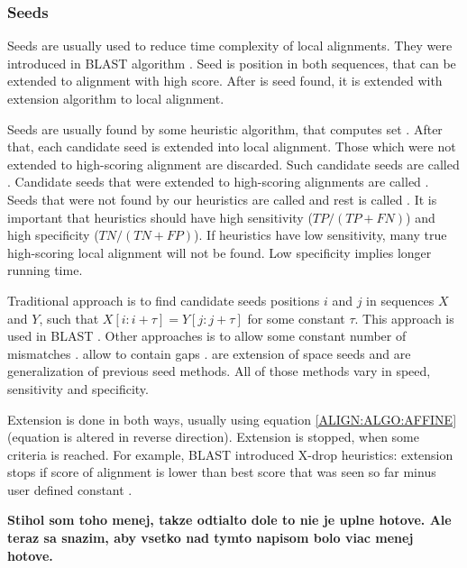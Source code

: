 \subsubsection{Seeds}

Seeds are usually used to reduce time complexity of local alignments.  They were
introduced in BLAST algorithm \cite{Altschul1990}.  Seed is position in both
sequences, that can be extended to alignment with high score. After is seed
found, it is extended with extension algorithm to local alignment.

Seeds are usually found by some heuristic algorithm, that computes set
. After that, each candidate seed is extended into
local alignment. Those which were not extended to high-scoring alignment are
discarded. Such candidate seeds are called .
Candidate seeds that were extended to high-scoring alignments are called
.  Seeds that were not found by our heuristics
are called  and rest is called
. It is important that heuristics should have
high sensitivity ($TP/(TP+FN)$) and high specificity ($TN/(TN+FP)$). If
heuristics have low sensitivity, many true high-scoring local alignment will not
be found. Low specificity implies longer running time. 

Traditional approach is to find candidate seeds positions $i$ and $j$ in
sequences $X$ and $Y$, such that $X[i:i+\tau]=Y[j:j+\tau]$ for some constant
$\tau$. This approach is used in BLAST \cite{Altschul1990}. Other approaches is
to allow some constant number of mismatches \cite{Kent2002}.  allow to contain gaps \cite{Ma2002}. 
\cite{Brejova2005vector} are extension of space seeds and  \cite{Csuros2005} are generalization of previous seed methods. All of
those methods vary in speed, sensitivity and specificity.

Extension is done in both ways, usually using equation \ref{ALIGN:ALGO:AFFINE}
(equation is altered in reverse direction). Extension is stopped, when some
criteria is reached. For example, BLAST introduced X-drop heuristics: extension stops
if score of alignment is lower than best score that was seen so far minus user
defined constant \cite{Altschul1997}.

\bigskip
{\large\bf Stihol som toho menej, takze odtialto dole to nie je uplne hotove.
Ale teraz sa snazim, aby vsetko nad tymto napisom bolo viac menej hotove. }
\bigskip


